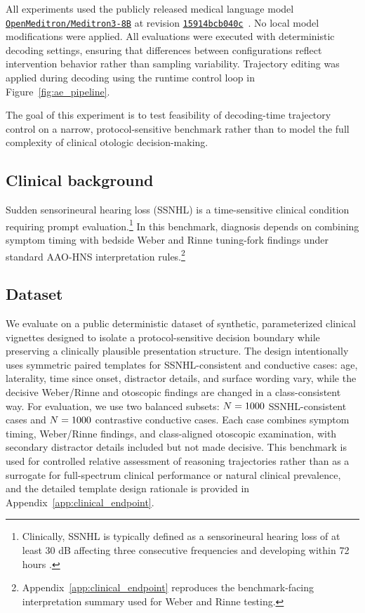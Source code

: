 \documentclass[twocolumn]{article}
\newcommand{\hfmodel}[1]{%
  \href{https://huggingface.co/#1}{\nolinkurl{#1}}%
}
\begin{document}
All experiments used the publicly released medical language model
\hfmodel{OpenMeditron/Meditron3-8B} %
at revision
\href{https://huggingface.co/OpenMeditron/Meditron3-8B/tree/15914bcb040cd1a4f263afcd85b84f09ad2efd95}
{\texttt{15914bcb040c}}~\parencite{openmeditron2025meditron3_8b}. No local
model modifications were applied. All evaluations were executed with
deterministic decoding settings, ensuring that differences between
configurations reflect intervention behavior rather than sampling variability.
Trajectory editing was applied during decoding using the runtime control loop in
Figure~\ref{fig:ae_pipeline}.

The goal of this experiment is to test feasibility of decoding-time trajectory
control on a narrow, protocol-sensitive benchmark rather than to model the full
complexity of clinical otologic decision-making.

\subsection{Clinical background}

Sudden sensorineural hearing loss (SSNHL) is a time-sensitive clinical condition
requiring prompt evaluation.\footnote{Clinically, SSNHL is typically defined as
a sensorineural hearing loss of at least 30 dB affecting three consecutive
frequencies and developing within 72 hours \parencite{chandrasekhar2019ssnhl}.}
In this benchmark, diagnosis depends on combining symptom timing with bedside
Weber and Rinne tuning-fork findings under standard AAO-HNS interpretation
rules.\footnote{Appendix~\ref{app:clinical_endpoint} reproduces the
benchmark-facing interpretation summary used for Weber and Rinne testing.}

\subsection{Dataset}
We evaluate on a public deterministic dataset of synthetic, parameterized
clinical vignettes designed to isolate a protocol-sensitive decision boundary
while preserving a clinically plausible presentation structure. The design
intentionally uses symmetric paired templates for SSNHL-consistent and
conductive cases: age, laterality, time since onset, distractor details, and
surface wording vary, while the decisive Weber/Rinne and otoscopic findings are
changed in a class-consistent way. For evaluation, we use two balanced subsets:
$N=1000$ SSNHL-consistent cases and $N=1000$ contrastive
conductive cases. Each case combines symptom timing, Weber/Rinne findings, and
class-aligned otoscopic examination, with secondary distractor details included
but not made decisive. This benchmark is used for controlled relative assessment
of reasoning trajectories rather than as a surrogate for full-spectrum clinical
performance or natural clinical prevalence, and the detailed template design
rationale is provided in Appendix~\ref{app:clinical_endpoint}.
\end{document}
